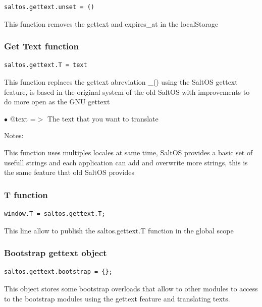 \documentclass[a4paper]{article}
\begin{document}
\begin{lstlisting}
saltos.gettext.unset = ()
\end{lstlisting}

This function removes the gettext and expires\_at in the localStorage

\hypertarget{toc242}{}
\subsubsection{Get Text function}

\begin{lstlisting}
saltos.gettext.T = text
\end{lstlisting}

This function replaces the gettext abreviation \_() using the SaltOS gettext
feature, is based in the original system of the old SaltOS with improvements
to do more open as the GNU gettext

\begin{compactitem}
\item[\color{myblue}$\bullet$] @text =$>$ The text that you want to translate
\end{compactitem}

Notes:

This function uses multiples locales at same time, SaltOS provides a basic set of
usefull strings and each application can add and overwrite more strings, this is
the same feature that old SaltOS provides

\hypertarget{toc243}{}
\subsubsection{T function}

\begin{lstlisting}
window.T = saltos.gettext.T;
\end{lstlisting}

This line allow to publish the saltos.gettext.T function in the global scope

\hypertarget{toc244}{}
\subsubsection{Bootstrap gettext object}

\begin{lstlisting}
saltos.gettext.bootstrap = {};
\end{lstlisting}

This object stores some bootstrap overloads that allow to other modules to
access to the bootstrap modules using the gettext feature and translating
texts.
\end{document}
